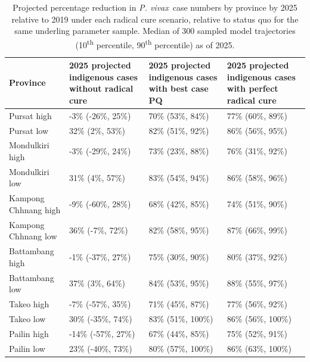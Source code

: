 \documentclass[doublespacing]{bmcart}
\newcommand\nth{\textsuperscript{th}\xspace} %
\newcommand{\pv}{\textit{P. vivax}}
\newcommand{\pq}{PQ}
\begin{document}
\begin{table}
\scriptsize
\begin{center}
\begin{tabular}{p{}p{}p{}p{}}
\hline
Province  &2025 projected indigenous cases without radical cure&2025 projected indigenous cases with best case \pq&2025 projected indigenous cases with perfect radical cure \\
\hline
Pursat high & -3\% (-26\%, 25\%)&70\% (53\%, 84\%)&77\% (60\%, 89\%) \\
Pursat low & 32\% (2\%, 53\%)&82\% (51\%, 92\%)&86\% (56\%, 95\%) \\
Mondulkiri high & -3\% (-29\%, 24\%)&73\% (23\%, 88\%)&76\% (31\%, 92\%) \\
Mondulkiri low & 31\% (4\%, 57\%)&83\% (54\%, 94\%)&86\% (58\%, 96\%) \\
Kampong Chhnang high & -9\% (-60\%, 28\%)&68\% (42\%, 85\%)&74\% (51\%, 90\%) \\
Kampong Chhnang low & 36\% (-7\%, 72\%)&82\% (58\%, 95\%)&87\% (66\%, 99\%) \\
Battambang high & -1\% (-37\%, 27\%)&75\% (30\%, 90\%)&80\% (37\%, 92\%) \\
Battambang low & 37\% (3\%, 64\%)&84\% (53\%, 95\%)&88\% (55\%, 97\%) \\
Takeo high & -7\% (-57\%, 35\%)&71\% (45\%, 87\%)&77\% (56\%, 92\%) \\
Takeo low & 30\% (-35\%, 74\%)&83\% (51\%, 100\%)&86\% (56\%, 100\%) \\
Pailin high & -14\% (-57\%, 27\%)&67\% (44\%, 85\%)&75\% (52\%, 91\%) \\
Pailin low & 23\% (-40\%, 73\%)&80\% (57\%, 100\%)&86\% (63\%, 100\%) \\
\hline
\end{tabular}
\caption{Projected percentage reduction in \pv~case numbers by province by 2025 relative to 2019 under each radical cure scenario, relative to status quo for the same underling parameter sample. Median of 300 sampled model trajectories (10\nth percentile, 90\nth percentile) as of 2025.}\label{tab:radcure_percentage}
\end{center}
\end{table}
\end{document}
